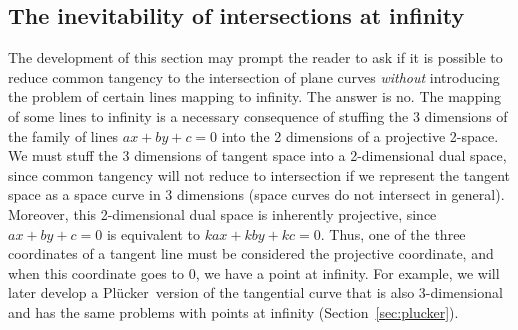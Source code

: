 \documentclass[9pt,twocolumn]{article}
\newcommand{\plucker}{Pl\"{u}cker\ }
\begin{document}
\subsection{The inevitability of intersections at infinity}

The development of this section may prompt the reader to ask if it is
possible to reduce common tangency to the intersection of plane curves
{\em without} introducing the problem of certain lines mapping to infinity.
The answer is no.
The mapping of some lines to infinity is a necessary consequence of 
stuffing the 3 dimensions of the family of lines $ax+by+c=0$
into the 2 dimensions of a projective 2-space.
We must stuff the 3 dimensions of tangent space into a 2-dimensional
dual space, since common tangency will not reduce to intersection if we represent
the tangent space as a space curve in 3 dimensions
(space curves do not intersect in general).
Moreover, this 2-dimensional dual space is inherently projective,
since $ax+by+c=0$ is equivalent to $kax+kby+kc=0$.
Thus, one of the three coordinates of a tangent line must be considered the 
projective coordinate, and
when this coordinate goes to 0, we have a point at infinity.
For example, we will later develop a \plucker version of the 
tangential curve that is also 3-dimensional
and has the same problems with points at infinity (Section~\ref{sec:plucker}).

\end{document}
